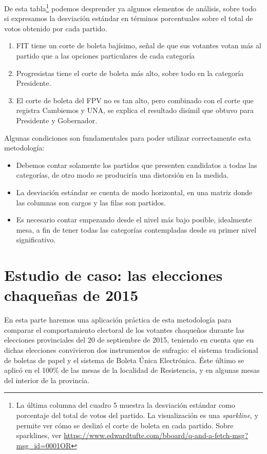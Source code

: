 \documentclass[12pt,a4paper]{article}
\begin{document}
De esta tabla\footnote{La última columna del cuadro 5 muestra la desviación
  estándar como porcentaje del total de votos del partido. La visualización es
  una \emph{sparkline}, y permite ver cómo se deslizó el corte de boleta en cada
partido. Sobre sparklines, ver
\url{https://www.edwardtufte.com/bboard/q-and-a-fetch-msg?msg_id=0001OR}}
podemos desprender ya algunos elementos de análisis, sobre todo si
expresamos la desviación estándar en términos porcentuales sobre el total de
votos obtenido por cada partido.
\begin{enumerate}
  \item FIT tiene un corte de boleta bajísimo, señal de que sus votantes votan más al partido
    que a las opciones particulares de cada categoría
  \item Progresistas tiene el corte de boleta más alto, sobre todo
    en la categoría Presidente.
  \item El corte de boleta del FPV no es tan alto, pero combinado con el corte
    que registra Cambiemos y UNA, se explica el resultado disímil que obtuvo
    para Presidente y Gobernador.
\end{enumerate}

Algunas condiciones son fundamentales para poder utilizar correctamente esta
metodología:

\begin{itemize}
  \item Debemos contar solamente los partidos que presenten candidatos a todas
    las categorías, de otro modo se produciría una distorsión en la medida.
  \item La desviación estándar se cuenta de modo horizontal, en una matriz donde
    las columnas son cargos y las filas son partidos.
  \item Es necesario contar empezando desde el nivel más bajo posible,
    idealmente mesa, a fin de tener todas las categorías contempladas desde su
    primer nivel significativo.
\end{itemize}

\pagebreak

\section{Estudio de caso: las elecciones chaqueñas de 2015}

En esta parte haremos una aplicación práctica de esta metodología para comparar
el comportamiento electoral de los votantes chaqueños durante las elecciones
provinciales del 20 de septiembre de 2015, teniendo en cuenta que en dichas
elecciones convivieron dos instrumentos de sufragio: el sistema tradicional de
boletas de papel y el sistema de Boleta Única Electrónica. Éste último se aplicó
en el 100\% de las mesas de la localidad de Resistencia, y en algunas mesas del
interior de la provincia.
\end{document}

